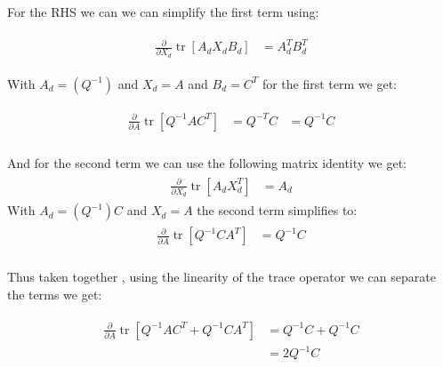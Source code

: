 \documentclass{tufte-handout}
\begin{document}
\begin{enumerate}[(a)]
    For the RHS we can we can simplify the first term using:  

    \begin{multline}
    \begin{aligned}     
        \frac{\partial}{\partial X_d} \operatorname{tr}\left[ A_d X_d B_d \right] &=  A_d^T B_d^T 
    \end{aligned}
    \end{multline}

    With $A_d = (Q^{-1})$ and $X_d = A$ and $B_d = C^T$ for the first term we get:
    
    \begin{multline}
        \begin{aligned}
            \frac{\partial}{\partial A} \operatorname{tr}\left[ Q^{-1}AC^T  \right] &=  Q^{-T}C &= Q^{-1}C \\
        \end{aligned} 
    \end{multline}
    
    And for the second term we can use the following matrix identity we get: 
    \begin{multline}
    \begin{aligned}     
        \frac{\partial}{\partial X_d} \operatorname{tr}\left[ A_d X_d^T \right] &= A_d
    \end{aligned}
    \end{multline}
    With $A_d = (Q^{-1})C$ and $X_d = A$ the second term simplifies to:  
    \begin{multline}
        \begin{aligned}
            \frac{\partial}{\partial A} \operatorname{tr}\left[ Q^{-1}CA^T  \right] &=  Q^{-1}C \\
        \end{aligned} 
    \end{multline}
   
    Thus taken together , using the linearity of the trace operator  we can separate the terms we get: 

    \begin{multline}
        \begin{aligned}
            \frac{\partial}{\partial A} \operatorname{tr}\left[ Q^{-1}AC^T  + Q^{-1}CA^T  \right] &= Q^{-1}C + Q^{-1}C \\
            &= 2 Q^{-1}C \\    
        \end{aligned}
    \end{multline}


\end{enumerate}
\end{document}
